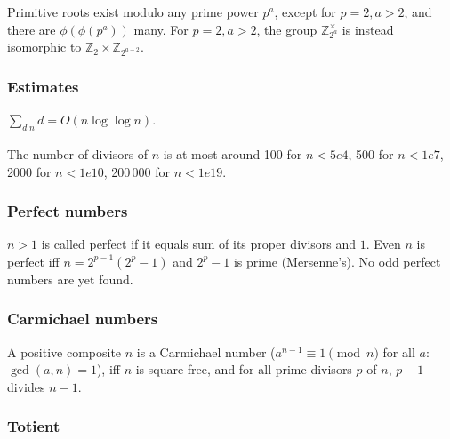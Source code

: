 {  Primitive roots exist modulo any prime power $p^a$, except for $p = 2, a > 2$, and there are $\phi(\phi(p^a))$ many.
  For $p = 2, a > 2$, the group $\mathbb Z_{2^a}^\times$ is instead isomorphic to $\mathbb Z_2 \times \mathbb Z_{2^{a-2}}$.

\subsubsection{Estimates}
  $\sum_{d|n} d = O(n \log \log n)$.

  The number of divisors of $n$ is at most around 100 for $n < 5e4$, 500 for $n < 1e7$, 2000 for $n < 1e10$, 200\,000 for $n < 1e19$.

\subsubsection{Perfect numbers}  $n>1$ is called perfect if it equals
sum of its proper divisors and $1$.  Even $n$ is perfect iff $n = 2^{p-1} (2^p - 1)$
and $2^p - 1$ is prime (Mersenne's). No odd perfect numbers are yet found.

\subsubsection{Carmichael numbers}
A positive composite $n$ is a Carmichael number
($a^{n-1} \equiv 1 \pmod{n}$ for all $a$: $\gcd(a,n)=1$),
iff $n$ is square-free, and for all prime divisors $p$ of $n$, $p-1$ divides $n-1$.

\subsubsection{Totient}

}
